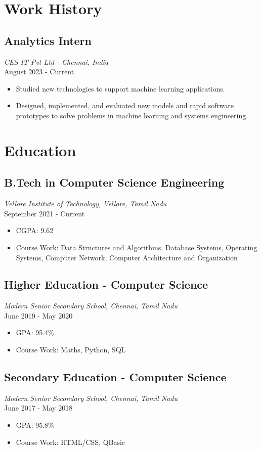 \documentclass[a4paper,10pt]{article}
\begin{document}
\section*{Work History}
\subsection*{\large\textbf{Analytics Intern}}
\textit{CES IT Pvt Ltd - Chennai, India} \\
August 2023 - Current
\begin{itemize}
    \item Studied new technologies to support machine learning applications.
    \item Designed, implemented, and evaluated new models and rapid software prototypes to solve problems in machine learning and systems engineering.
\end{itemize}

\section*{Education}
\subsection*{\large\textbf{B.Tech in Computer Science Engineering}}
\textit{Vellore Institute of Technology, Vellore, Tamil Nadu} \\
September 2021 - Current
\begin{itemize}
    \item CGPA: 9.62
    \item Course Work: Data Structures and Algorithms, Database Systems, Operating Systems, Computer Network, Computer Architecture and Organization
\end{itemize}

\subsection*{\large\textbf{Higher Education - Computer Science}}
\textit{Modern Senior Secondary School, Chennai, Tamil Nadu} \\
June 2019 - May 2020
\begin{itemize}
    \item GPA: 95.4\%
    \item Course Work: Maths, Python, SQL
\end{itemize}

\subsection*{\large\textbf{Secondary Education - Computer Science}}
\textit{Modern Senior Secondary School, Chennai, Tamil Nadu} \\
June 2017 - May 2018
\begin{itemize}
    \item GPA: 95.8\%
    \item Course Work: HTML/CSS, QBasic
\end{itemize}
\end{document}
